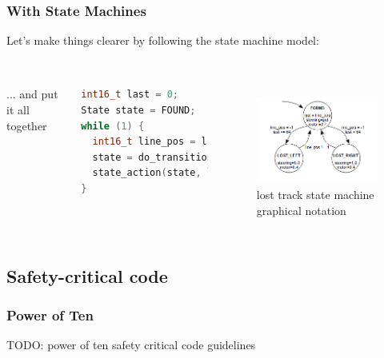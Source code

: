 \documentclass{beamer}
\begin{document}
\begin{frame}[fragile]
\frametitle{With State Machines}
Let's make things clearer by following the state machine model: \\
\hfill \\
\begin{columns}[t]
... and put it all together
\begin{lstlisting}[language=C++,basicstyle=\ttfamily\tiny]
int16_t last = 0;
State state = FOUND;
while (1) {
  int16_t line_pos = line_detect(camera_data);
  state = do_transition(state, line_pos, last);
  state_action(state, line_pos, last);
}
\end{lstlisting}

\begin{figure}[h!]
\includegraphics[width=1.0\columnwidth]{images/statemachine} \\
lost track state machine \\
graphical notation
\end{figure}
\end{columns}
\end{frame}


\subsection{Safety-critical code}
\begin{frame}[fragile]
\frametitle{Power of Ten}
TODO: power of ten safety critical code guidelines
\end{frame}
\end{document}
